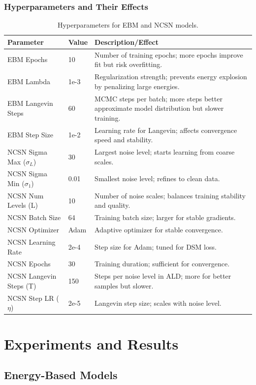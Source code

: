 \documentclass[a4paper,12pt]{article}
\begin{document}
\subsubsection{Hyperparameters and Their Effects}
\begin{table}[H]
\centering
\caption{Hyperparameters for EBM and NCSN models.}
\label{tab:hyperparams}
\begin{tabular}{@{}lll@{}}
\toprule
Parameter & Value & Description/Effect \\
\midrule
EBM Epochs & 10 & Number of training epochs; more epochs improve fit but risk overfitting. \\
EBM Lambda & 1e-3 & Regularization strength; prevents energy explosion by penalizing large energies. \\
EBM Langevin Steps & 60 & MCMC steps per batch; more steps better approximate model distribution but slower training. \\
EBM Step Size & 1e-2 & Learning rate for Langevin; affects convergence speed and stability. \\
NCSN Sigma Max ($\sigma_L$) & 30 & Largest noise level; starts learning from coarse scales. \\
NCSN Sigma Min ($\sigma_1$) & 0.01 & Smallest noise level; refines to clean data. \\
NCSN Num Levels (L) & 10 & Number of noise scales; balances training stability and quality. \\
NCSN Batch Size & 64 & Training batch size; larger for stable gradients. \\
NCSN Optimizer & Adam & Adaptive optimizer for stable convergence. \\
NCSN Learning Rate & 2e-4 & Step size for Adam; tuned for DSM loss. \\
NCSN Epochs & 30 & Training duration; sufficient for convergence. \\
NCSN Langevin Steps (T) & 150 & Steps per noise level in ALD; more for better samples but slower. \\
NCSN Step LR ($\eta$) & 2e-5 & Langevin step size; scales with noise level. \\
\bottomrule
\end{tabular}
\end{table}

\section{Experiments and Results}

\subsection{Energy-Based Models}
\end{document}
